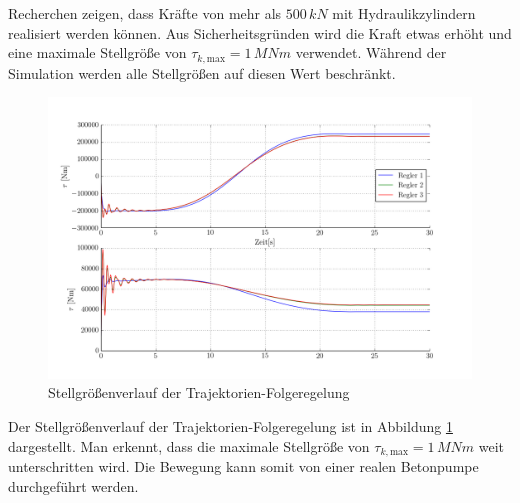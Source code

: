 Recherchen zeigen, dass Kräfte von mehr als $500\,\si{kN}$ mit Hydraulikzylindern realisiert werden können. Aus Sicherheitsgründen wird die Kraft etwas erhöht und eine maximale Stellgröße von $\tau_{k,\mathrm{max}} = 1 \,\si{MNm}$ verwendet. Während der Simulation werden alle Stellgrößen auf diesen Wert beschränkt.\newline
\newline
	\begin{figure}[h!]
		\centering
		\includegraphics[scale=0.5]{Bilder/Stellgroessen_Trajektorien_Folgeregelung.png}
		\caption{Stellgrößenverlauf der Trajektorien-Folgeregelung}
		\label{fig:Stellgroessen_Trajektorien_Folgeregelung}
	\end{figure}\newline
Der Stellgrößenverlauf der Trajektorien-Folgeregelung ist in Abbildung \ref{fig:Stellgroessen_Trajektorien_Folgeregelung} dargestellt. Man erkennt, dass die maximale Stellgröße von $\tau_{k,\mathrm{max}} = 1 \,\si{MNm}$ weit unterschritten wird. Die Bewegung kann somit von einer realen Betonpumpe durchgeführt werden. 

